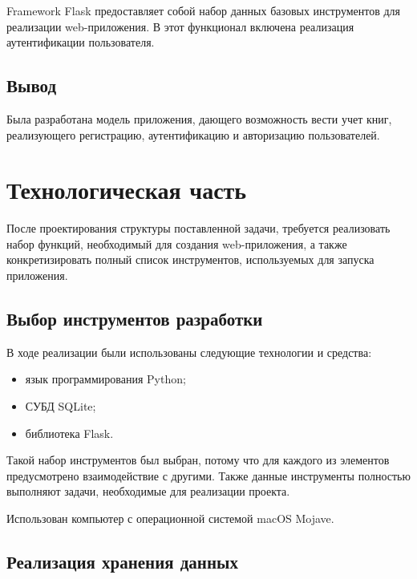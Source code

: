 \documentclass[12pt]{article}
\begin{document}
Framework Flask предоставляет собой набор данных базовых инструментов для реализации web-приложения. В этот функционал включена реализация аутентификации пользователя.


\subsection{Вывод}%
\setcounter{subsection}{4}

Была разработана модель приложения, дающего возможность вести учет книг, реализующего регистрацию, аутентификацию и авторизацию пользователей.


\newpage
\section{Технологическая часть}%
\setcounter{section}{3}

После проектирования структуры поставленной задачи, требуется реализовать набор функций, необходимый для создания web-приложения, а также конкретизировать полный список инструментов, используемых для запуска приложения.

\subsection{Выбор инструментов разработки}%
\setcounter{subsection}{1}

В ходе реализации были использованы следующие технологии и средства:

\begin{itemize}
	\item язык программирования Python;
	\item СУБД SQLite;
	\item библиотека Flask.
\end{itemize}

Такой набор инструментов был выбран, потому что для каждого из элементов предусмотрено взаимодействие с другими.
Также данные инструменты полностью выполняют задачи, необходимые для реализации проекта.

Использован компьютер с операционной системой macOS Mojave.

\subsection{Реализация хранения данных}%
\setcounter{subsection}{2}
\end{document}
